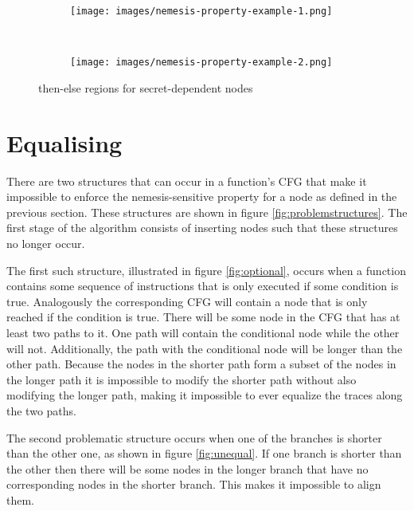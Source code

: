\begin{figure*}[t!]
    \centering
    \begin{subfigure}[t]{0.5\textwidth}
        \centering
        \texttt{[image: images/nemesis-property-example-1.png]}
        \caption{}
        \label{fig:regionExampleA}
    \end{subfigure}%
    ~
    \begin{subfigure}[t]{0.5\textwidth}
        \centering
        \texttt{[image: images/nemesis-property-example-2.png]}
        \caption{}
        \label{fig:regionExampleB}
    \end{subfigure}
    \caption{then-else regions for secret-dependent nodes}
    \label{fig:regionExamples}
\end{figure*}

\section{Equalising}
\label{seq:equalising}
There are two structures that can occur in a function's CFG that make it impossible to enforce the nemesis-sensitive property for a node as defined in the previous section. 
These structures are shown in figure \ref{fig:problemstructures}.  
The first stage of the algorithm consists of inserting nodes such that these structures no longer occur. 

The first such structure, illustrated in figure \ref{fig:optional}, occurs when a function contains some sequence of instructions that is only executed if some condition is true.
Analogously the corresponding CFG will contain a node that is only reached if the condition is true.
There will be some node in the CFG that has at least two paths to it. 
One path will contain the conditional node while the other will not. 
Additionally, the path with the conditional node will be longer than the other path. 
Because the nodes in the shorter path form a subset of the nodes in the longer path it is impossible to modify the shorter path without also modifying the longer path, making it 
impossible to ever equalize the traces along the two paths.

The second problematic structure occurs when one of the branches is shorter than the other one, as shown in figure \ref	{fig:unequal}. 
If one branch is shorter than the other then there will be some nodes in the longer branch that have no corresponding  nodes in the shorter branch. 
This makes it impossible to align them. 

